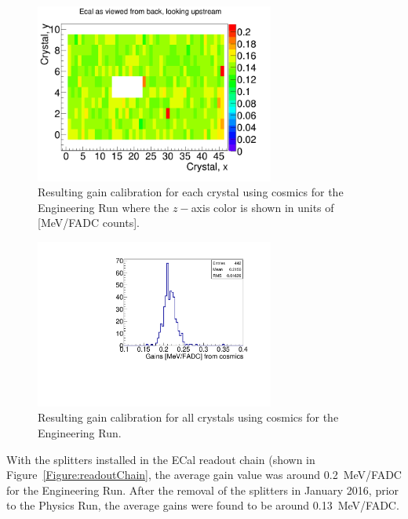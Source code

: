 \begin{figure}[htb]
  \centering
      \includegraphics[width=0.7\textwidth]{pics/performance/cosmicGains2015.png}
  \caption[Resulting 2015 gain calibration in the ECal using cosmic ray muons shown by ECal module position]{Resulting gain calibration for each crystal using cosmics for the Engineering Run where the $z-$axis color is shown in units of [MeV/FADC counts].}
  \label{Figure:cosmicG}
\end{figure}


\begin{figure}[htb]
  \centering
      \includegraphics[width=0.7\textwidth]{pics/performance/cosmicGainsMay15.pdf}
  \caption[Distribution of the resulting 2015 gains in the ECal using cosmic ray muons]{Resulting gain calibration for all crystals using cosmics for the Engineering Run.}
  \label{Figure:cosmicGhisto}
\end{figure}

With the splitters installed in the ECal readout chain (shown in Figure~\ref{Figure:readoutChain}, the average gain value was around 0.2~MeV/FADC for the Engineering Run. After the removal of the splitters in January 2016, prior to the Physics Run, the average gains were found to be around 0.13~MeV/FADC.

